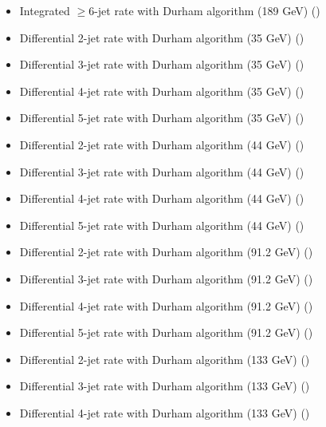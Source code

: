\begin{itemize}
  \item Integrated $\geq$6-jet rate with Durham algorithm (189 GeV) ({\smaller {}})
  \item Differential 2-jet rate with Durham algorithm (35 GeV) ({\smaller {}})
  \item Differential 3-jet rate with Durham algorithm (35 GeV) ({\smaller {}})
  \item Differential 4-jet rate with Durham algorithm (35 GeV) ({\smaller {}})
  \item Differential 5-jet rate with Durham algorithm (35 GeV) ({\smaller {}})
  \item Differential 2-jet rate with Durham algorithm (44 GeV) ({\smaller {}})
  \item Differential 3-jet rate with Durham algorithm (44 GeV) ({\smaller {}})
  \item Differential 4-jet rate with Durham algorithm (44 GeV) ({\smaller {}})
  \item Differential 5-jet rate with Durham algorithm (44 GeV) ({\smaller {}})
  \item Differential 2-jet rate with Durham algorithm (91.2 GeV) ({\smaller {}})
  \item Differential 3-jet rate with Durham algorithm (91.2 GeV) ({\smaller {}})
  \item Differential 4-jet rate with Durham algorithm (91.2 GeV) ({\smaller {}})
  \item Differential 5-jet rate with Durham algorithm (91.2 GeV) ({\smaller {}})
  \item Differential 2-jet rate with Durham algorithm (133 GeV) ({\smaller {}})
  \item Differential 3-jet rate with Durham algorithm (133 GeV) ({\smaller {}})
  \item Differential 4-jet rate with Durham algorithm (133 GeV) ({\smaller {}})

\end{itemize}
